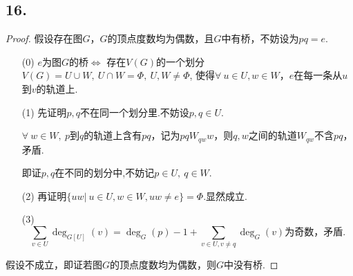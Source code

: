 \documentclass{article}
\begin{document}
\subsection*{16.}
\begin{proof}
    假设存在图$G$，$G$的顶点度数均为偶数，且$G$中有桥，不妨设为$pq=e$.
    \begin{enumerate}
        \item [(0)]$e$为图$G$的桥$\Leftrightarrow$
        存在$V(G)$的一个划分$V(G)=U\cup W,\ U\cap W=\Phi,\ U,W\neq \Phi$,
        使得$\forall\ u\in U,w\in W$，$e$在每一条从$u$到$v$的轨道上.
        \item [(1)]先证明$p,q$不在同一个划分里.不妨设$p,q\in U$.
        
        $\forall\ w\in W,\ p$到$q$的轨道上含有$pq$，记为$p q W_{qw} w$，则$q,w$之间的轨道$W_{qw}$不含$pq$，矛盾.

        即证$p,q$在不同的划分中,不妨记$p\in U,\ q\in W$.
        \item [(2)]再证明$\{uw|\ u\in U, w\in W,uw\neq e\}=\Phi$.显然成立.
        \item [(3)]
        \[
            \sum\limits_{v\in U} \deg_{G[U]} (v)=\deg_{G} (p)-1+\sum\limits_{v\in U,v\neq q} \deg_{G} (v)
            \mbox{为奇数，矛盾}.
        \]
    \end{enumerate}
    假设不成立，即证若图$G$的顶点度数均为偶数，则$G$中没有桥.
\end{proof}
\end{document}
